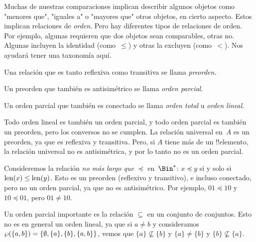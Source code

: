 \documentclass[../../../include/open-logic-section]{subfiles}
\begin{document}

\begin{explain}
Muchas de nuestras comparaciones implican describir algunos objetos como "menores que", "iguales a" o "mayores que" otros objetos, en cierto aspecto. Estos implican relaciones de \emph{orden}. Pero hay diferentes tipos de relaciones de orden. Por ejemplo, algunas requieren que dos objetos sean comparables, otras no. Algunas incluyen la identidad (como~$\le$) y otras la excluyen (como~$<$). Nos ayudará tener una taxonomía aquí.
\end{explain}

\begin{defn}[Preorden]
Una relación que es tanto reflexiva como transitiva se llama \emph{preorden}.
\end{defn}

\begin{defn}
Un preorden que también es antisimétrico se llama \emph{orden parcial}.
\end{defn}

\begin{defn}
Un orden parcial que también es conectado se llama \emph{orden total} u \emph{orden lineal}.
\end{defn}

\begin{ex}
Todo orden lineal es también un orden parcial, y todo orden parcial es también un preorden, pero los conversos no se cumplen. La relación universal en~$A$ es un preorden, ya que es reflexiva y transitiva. Pero, si $A$ tiene más de un !!{element}o, la relación universal no es antisimétrica, y por lo tanto no es un orden parcial.
\end{ex}

\begin{ex}
Consideremos la relación \emph{no más largo que} $\preccurlyeq$ en~$\Bin^*$: $x \preccurlyeq y$ si y solo si $\mathrm{len}(x) \le \mathrm{len}(y)$. Esto es un preorden (reflexivo y transitivo), e incluso conectado, pero no un orden parcial, ya que no es antisimétrico. Por ejemplo, $01 \preccurlyeq 10$ y $10 \preccurlyeq 01$, pero $01 \neq 10$.
\end{ex}

\begin{ex}
Un orden parcial importante es la relación $\subseteq$ en un conjunto de conjuntos. Esto no es en general un orden lineal, ya que si $a \neq b$ y consideramos $\wp(\{a, b\}) = \{\emptyset, \{a\}, \{b\}, \{a,b\}\}$, vemos que $\{a\} \nsubseteq \{b\}$ y $\{a\} \neq \{b\}$ y $\{b\} \nsubseteq \{a\}$.
\end{ex}
\end{document}
